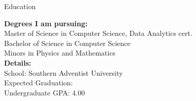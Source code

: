 
\begin{rSection}{Education}
  \begin{vwcol}[widths={0.6,0.4},
      sep=0.2cm, justify=flush,rule=0pt,indent=1em]
    {\bf\small Degrees I am pursuing:}\\
    Master of Science in Computer Science, Data Analytics cert.\\
    Bachelor of Science in Computer Science\\
    Minors in Physics and Mathematics\\
    {\bf\small Details:}\\
    School: {Southern Adventist University}\\
    Expected Graduation: \\
    Undergraduate GPA: {4.00}
  \end{vwcol}
\end{rSection}

